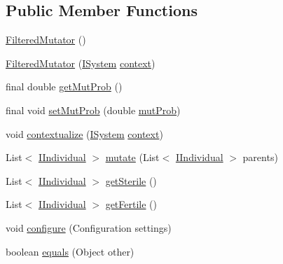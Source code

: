 \subsection*{Public Member Functions}
\begin{DoxyCompactItemize}
\item 
\hyperlink{classnet_1_1sf_1_1jclec_1_1base_1_1_filtered_mutator_a8d57508927040d3b1538ca3d2173a6ee}{Filtered\-Mutator} ()
\item 
\hyperlink{classnet_1_1sf_1_1jclec_1_1base_1_1_filtered_mutator_af32a7cbc7b7804064665f259462d21e5}{Filtered\-Mutator} (\hyperlink{interfacenet_1_1sf_1_1jclec_1_1_i_system}{I\-System} \hyperlink{classnet_1_1sf_1_1jclec_1_1base_1_1_decorated_mutator_a0f500ae1072a9663fa96475891c074bc}{context})
\item 
final double \hyperlink{classnet_1_1sf_1_1jclec_1_1base_1_1_filtered_mutator_ad7f2ca81314e6806dc6b2f4e18e3b25a}{get\-Mut\-Prob} ()
\item 
final void \hyperlink{classnet_1_1sf_1_1jclec_1_1base_1_1_filtered_mutator_a3d69423a21fea9eadf14aaa42c5784e3}{set\-Mut\-Prob} (double \hyperlink{classnet_1_1sf_1_1jclec_1_1base_1_1_filtered_mutator_ac5ca6f680430f923bc7e92a7de095721}{mut\-Prob})
\item 
void \hyperlink{classnet_1_1sf_1_1jclec_1_1base_1_1_filtered_mutator_ae5664f7971d88d670a061b2057774e83}{contextualize} (\hyperlink{interfacenet_1_1sf_1_1jclec_1_1_i_system}{I\-System} \hyperlink{classnet_1_1sf_1_1jclec_1_1base_1_1_decorated_mutator_a0f500ae1072a9663fa96475891c074bc}{context})
\item 
List$<$ \hyperlink{interfacenet_1_1sf_1_1jclec_1_1_i_individual}{I\-Individual} $>$ \hyperlink{classnet_1_1sf_1_1jclec_1_1base_1_1_filtered_mutator_a2664243ad8b112a7928ded718da6e5d5}{mutate} (List$<$ \hyperlink{interfacenet_1_1sf_1_1jclec_1_1_i_individual}{I\-Individual} $>$ parents)
\item 
List$<$ \hyperlink{interfacenet_1_1sf_1_1jclec_1_1_i_individual}{I\-Individual} $>$ \hyperlink{classnet_1_1sf_1_1jclec_1_1base_1_1_filtered_mutator_ac2b4533802c2048c60b176533e50c573}{get\-Sterile} ()
\item 
List$<$ \hyperlink{interfacenet_1_1sf_1_1jclec_1_1_i_individual}{I\-Individual} $>$ \hyperlink{classnet_1_1sf_1_1jclec_1_1base_1_1_filtered_mutator_ab7e133065fd51bde74cfc58d39c53e9a}{get\-Fertile} ()
\item 
void \hyperlink{classnet_1_1sf_1_1jclec_1_1base_1_1_filtered_mutator_a7927e4ea992f2c8dfff69ddd4d66b298}{configure} (Configuration settings)
\item 
boolean \hyperlink{classnet_1_1sf_1_1jclec_1_1base_1_1_filtered_mutator_ae142320a5476894c05893cbcdb25eaac}{equals} (Object other)
\end{DoxyCompactItemize}
